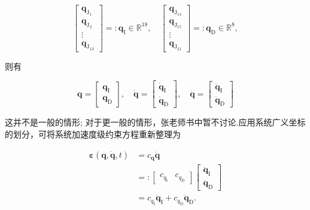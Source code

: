 \[
\left[\begin{array}{c}
\boldsymbol{q}_{\mathrm{J}_{1}} \\
\boldsymbol{q}_{\mathrm{J}_{2}} \\
\vdots \\
\boldsymbol{q}_{\mathrm{J}_{13}}
\end{array}\right]=: \boldsymbol{q}_{\mathrm{I}} \in \mathbb{R}^{18}, \quad\left[\begin{array}{c}
\boldsymbol{q}_{\mathrm{J}_{14}} \\
\boldsymbol{q}_{\mathrm{J}_{15}} \\
\vdots \\
\boldsymbol{q}_{\mathrm{J}_{21}}
\end{array}\right]=: \boldsymbol{q}_{\mathrm{D}} \in \mathbb{R}^{8},
\]

则有

\[
\boldsymbol{q}=\left[\begin{array}{c}
\boldsymbol{q}_{\mathrm{I}} \\
\boldsymbol{q}_{\mathrm{D}}
\end{array}\right], \quad \dot{\boldsymbol{q}}=\left[\begin{array}{c}
\dot{\boldsymbol{q}}_{\mathrm{I}} \\
\dot{\boldsymbol{q}}_{\mathrm{D}}
\end{array}\right], \quad \ddot{\boldsymbol{q}}=\left[\begin{array}{c}
\ddot{\boldsymbol{q}}_{\mathrm{I}} \\
\ddot{\boldsymbol{q}}_{\mathrm{D}}
\end{array}\right]
\]

这并不是一般的情形; 对于更一般的情形，张老师书中暂不讨论.应用系统广义坐标的划分，可将系统加速度级约束方程重新整理为

\[
\begin{aligned}
\boldsymbol{\varepsilon}(\boldsymbol{q}, \dot{\boldsymbol{q}}, t) & =c_{\boldsymbol{q}} \ddot{\boldsymbol{q}} \\
& =:\left[\begin{array}{ll}
c_{q_{\mathrm{I}}} & c_{q_{\mathrm{D}}}
\end{array}\right]\left[\begin{array}{c}
\ddot{\boldsymbol{q}}_{\mathrm{I}} \\
\ddot{\boldsymbol{q}}_{\mathrm{D}}
\end{array}\right] \\
& =c_{q_{\mathrm{I}}} \ddot{\boldsymbol{q}}_{\mathrm{I}}+c_{q_{\mathrm{D}}} \ddot{\boldsymbol{q}}_{\mathrm{D}} .
\end{aligned}
\]

